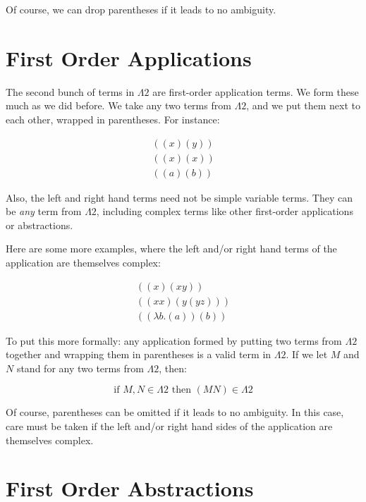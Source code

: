 \documentclass{book}
\numberwithin{equation}{chapter}
\begin{document}
\noindent
Of course, we can drop parentheses if it leads to no ambiguity.


\section{First Order Applications}

The second bunch of terms in $\Lambda 2$ are first-order application terms. We form these much as we did before. We take any two terms from $\Lambda 2$, and we put them next to each other, wrapped in parentheses. For instance:

\begin{align}
  ((x) (y)) \\
  ((x) (x)) \\
  ((a) (b))
\end{align}

\noindent
Also, the left and right hand terms need not be simple variable terms. They can be \textit{any} term from $\Lambda 2$, including complex terms like other first-order applications or abstractions.

Here are some more examples, where the left and/or right hand terms of the application are themselves complex:

\begin{align}
  ((x) (x y)) \\
  ((x x) (y (y z))) \\
  ((\lambda b.(a)) (b))
\end{align}

\noindent
To put this more formally: any application formed by putting two terms from $\Lambda 2$ together and wrapping them in parentheses is a valid term in $\Lambda 2$. If we let $M$ and $N$ stand for any two terms from $\Lambda 2$, then:

\begin{equation}
\text{if } M, N \in \Lambda 2 \text{ then } (M N) \in \Lambda 2
\end{equation}

\noindent
Of course, parentheses can be omitted if it leads to no ambiguity. In this case, care must be taken if the left and/or right hand sides of the application are themselves complex.


\section{First Order Abstractions}
\end{document}
